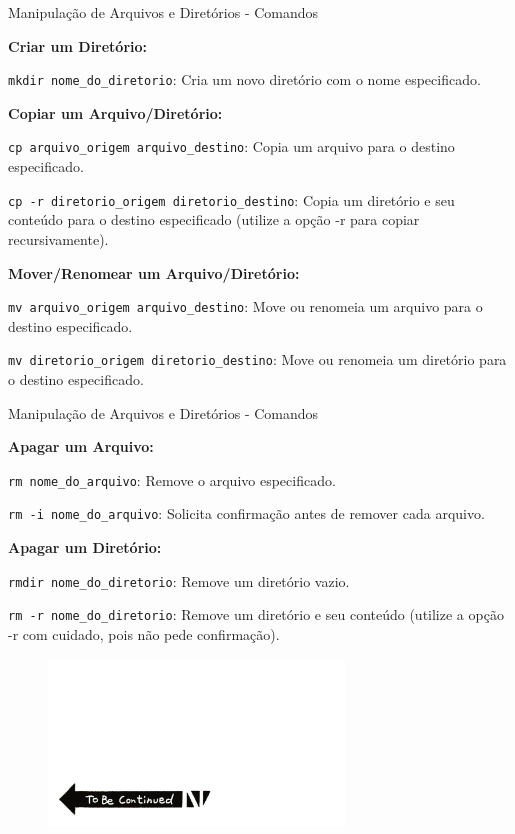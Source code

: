 \documentclass{beamer}
\begin{document}
\begin{frame}{Manipulação de Arquivos e Diretórios - Comandos}

	\textbf{Criar um Diretório:}

	\texttt{mkdir nome\_do\_diretorio}: Cria um novo diretório com o nome especificado.

	\textbf{Copiar um Arquivo/Diretório:}

	\texttt{cp arquivo\_origem arquivo\_destino}: Copia um arquivo para o destino especificado.

	\texttt{cp -r diretorio\_origem diretorio\_destino}: Copia um diretório e seu conteúdo para o destino especificado (utilize a opção -r para copiar recursivamente).

	\textbf{Mover/Renomear um Arquivo/Diretório:}

	\texttt{mv arquivo\_origem arquivo\_destino}: Move ou renomeia um arquivo para o destino especificado.

	\texttt{mv diretorio\_origem diretorio\_destino}: Move ou renomeia um diretório para o destino especificado.

\end{frame}

\begin{frame}{Manipulação de Arquivos e Diretórios - Comandos}

	\textbf{Apagar um Arquivo:}

	\texttt{rm nome\_do\_arquivo}: Remove o arquivo especificado.

	\texttt{rm -i nome\_do\_arquivo}: Solicita confirmação antes de remover cada arquivo.

	\textbf{Apagar um Diretório:}

	\texttt{rmdir nome\_do\_diretorio}: Remove um diretório vazio.

	\texttt{rm -r nome\_do\_diretorio}: Remove um diretório e seu conteúdo (utilize a opção -r com cuidado, pois não pede confirmação).

\end{frame}


\begin{frame}[fragile]

	\begin{figure}[H]
		\centerline{\includegraphics[width=0.7\textwidth]{assets/imagem-do-dia/to-be-continued.png}}

	\end{figure}
\end{frame}
\end{document}
